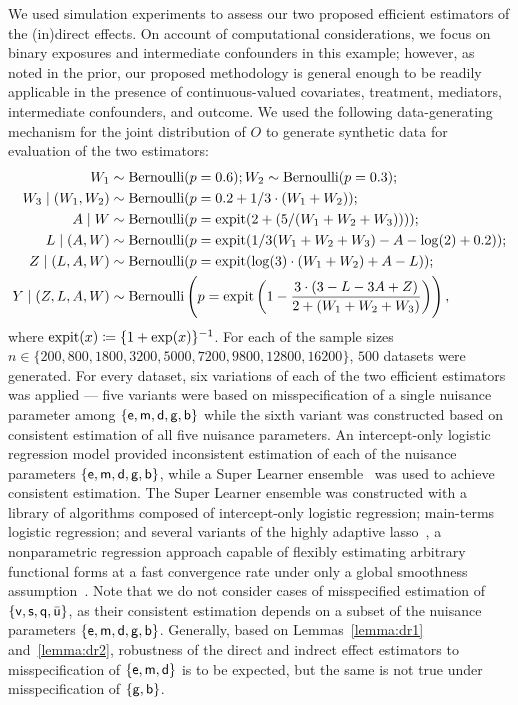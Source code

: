 We used simulation experiments to assess our two proposed efficient estimators
of the (in)direct effects. On account of computational considerations, we focus
on binary exposures and intermediate confounders in this example; however, as
noted in the prior, our proposed methodology is general enough to be readily
applicable in the presence of continuous-valued covariates, treatment,
mediators, intermediate confounders, and outcome. We used the following
data-generating mechanism for the joint distribution of $O$ to generate
synthetic data for evaluation of the two estimators:
\begin{align*}
W_1 &\sim \text{Bernoulli}(p = 0.6);
W_2 \sim \text{Bernoulli}(p = 0.3);\\
W_3 \mid (W_1, W_2) &\sim \text{Bernoulli}(p = 0.2 + 1/3 \cdot (W_1 + W_2));\\
A \mid W &\sim \text{Bernoulli}(p = \operatorname{expit}(2 + (5 / (W_1 +
    W_2 + W_3))));\\
L \mid (A, W) &\sim \text{Bernoulli}(p = \operatorname{expit}(1/3(W_1 + W_2 + W_3) - A -
  \log(2) + 0.2));\\
Z \mid (L, A, W) &\sim \text{Bernoulli}(p = \operatorname{expit}(\log(3) \cdot (W_1 + W_2)
    + A - L));\\
Y \mid (Z, L, A, W) &\sim \text{Bernoulli}\left(p = \operatorname{expit}\left(1 -
   \frac{3 \cdot (3 - L - 3A + Z)}{2 + (W_1 + W_2 + W_3)} \right)\right),
\end{align*}
where $\operatorname{expit}(x) \coloneqq \{1 + \exp(x)\}^{-1}$. For each of the sample sizes
$n \in \{200, 800, 1800, 3200, 5000, \allowbreak 7200, 9800, 12800,
16200\}$, $500$ datasets were generated. For every dataset, six variations of
each of the two efficient estimators was applied --- five variants were based on
misspecification of a single nuisance parameter among $\{\mathsf{e}, \mathsf{m}, \mathsf{d}, \mathsf{g}, \mathsf{b}\}$
while the sixth variant was constructed based on consistent estimation of all
five nuisance parameters. An intercept-only logistic regression model
provided inconsistent estimation of each of the nuisance parameters $\{\mathsf{e}, \mathsf{m},
\mathsf{d}, \mathsf{g}, \mathsf{b}\}$, while a Super Learner ensemble~\citep{vdl2007super} was used to
achieve consistent estimation. The Super Learner ensemble was constructed with
a library of algorithms composed of intercept-only logistic regression;
main-terms logistic regression; and several variants of the highly adaptive
lasso~\citep{benkeser2016highly, vdl2017generally, hejazi2020hal9001,
coyle2021hal9001}, a nonparametric regression approach capable of flexibly
estimating arbitrary functional forms at a fast convergence rate under only
a global smoothness assumption~\citep{vdl2017uniform, bibaut2019fast}. Note that
we do not consider cases of misspecified estimation of $\{\mathsf{v}, \mathsf{s}, \mathsf{q},
\bar{\mathsf{u}}\}$, as their consistent estimation depends on a subset of the nuisance
parameters $\{\mathsf{e}, \mathsf{m}, \mathsf{d}, \mathsf{g}, \mathsf{b}\}$. Generally, based on Lemmas~\ref{lemma:dr1}
and~\ref{lemma:dr2}, robustness of the direct and indrect effect estimators to
misspecification of $\{\mathsf{e}, \mathsf{m}, \mathsf{d}\}$ is to be expected, but the same is not true
under misspecification of $\{\mathsf{g}, \mathsf{b}\}$.

